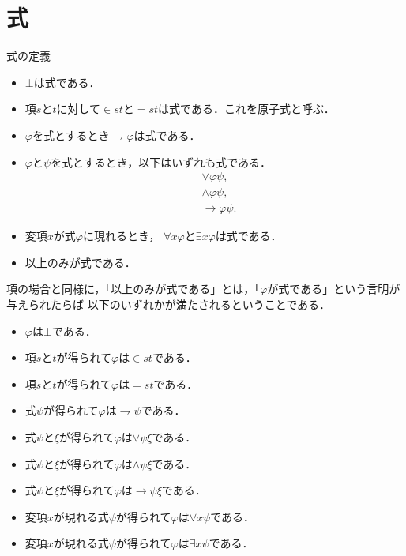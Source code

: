 \documentclass[a4j,10.5pt,oneside,openany]{jsbook}
\begin{document}
\section{式}

	\begin{itembox}[l]{式の定義}
		\begin{itemize}
			\item $\bot$は式である．
			\item 項$s$と$t$に対して$\in st$と$=st$は式である．これを原子式と呼ぶ．
			\item $\varphi$を式とするとき$\rightharpoondown \varphi$は式である．
			\item $\varphi$と$\psi$を式とするとき，以下はいずれも式である．
				\begin{align}
					&\vee \varphi \psi, \\
					&\wedge \varphi \psi, \\
					&\rightarrow \varphi \psi.
				\end{align}
			
			\item 変項$x$が式$\varphi$に現れるとき，
				$\forall x \varphi$と$\exists x \varphi$は式である．
			
			\item 以上のみが式である．
		\end{itemize}
	\end{itembox}
	
	項の場合と同様に，「以上のみが式である」とは，「$\varphi$が式である」という言明が与えられたらば
	以下のいずれかが満たされるということである．
	\begin{itemize}
		\item $\varphi$は$\bot$である．
		\item 項$s$と$t$が得られて$\varphi$は$\in s t$である．
		\item 項$s$と$t$が得られて$\varphi$は$= s t$である．
		\item 式$\psi$が得られて$\varphi$は$\rightharpoondown \psi$である．
		\item 式$\psi$と$\xi$が得られて$\varphi$は$\vee \psi \xi$である．
		\item 式$\psi$と$\xi$が得られて$\varphi$は$\wedge \psi \xi$である．
		\item 式$\psi$と$\xi$が得られて$\varphi$は$\rightarrow \psi \xi$である．
		\item 変項$x$が現れる式$\psi$が得られて$\varphi$は$\forall x \psi$である．
		\item 変項$x$が現れる式$\psi$が得られて$\varphi$は$\exists x \psi$である．
	\end{itemize}
	
\end{document}
